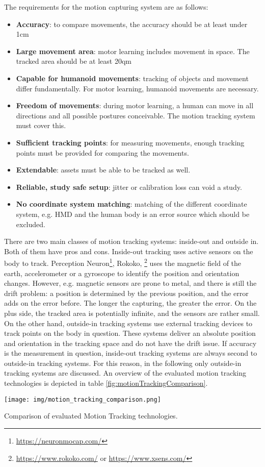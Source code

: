 The requirements for the motion capturing system are as follows: 
\begin{itemize}
	\item \textbf{Accuracy}: to compare movements, the accuracy should be at least under 1cm
	\item \textbf{Large movement area}: motor learning includes movement in space. The tracked area should be at least 20qm
	\item \textbf{Capable for humanoid movements}: tracking of objects and movement differ fundamentally. For motor learning, humanoid movements are necessary.
	\item \textbf{Freedom of movements}: during motor learning, a human can move in all directions and all possible postures conceivable. The motion tracking system must cover this.
	\item \textbf{Sufficient tracking points}: for measuring movements, enough tracking points must be provided for comparing the movements.
	\item \textbf{Extendable}: assets must be able to be tracked as well.
	\item \textbf{Reliable, study safe setup}: jitter or calibration loss can void a study.
	\item \textbf{No coordinate system matching}: matching of the different coordinate system, e.g. HMD and the human body is an error source which should be excluded.
\end{itemize}
There are two main classes of motion tracking systems: inside-out and outside in. Both of them have pros and cons. Inside-out tracking uses active sensors on the body to track. Perception Neuron\footnote{\href{https://neuronmocap.com/}{https://neuronmocap.com/}}, Rokoko, \footnote{\href{https://www.rokoko.com/}{https://www.rokoko.com/} or \href{https://www.xsens.com/}{https://www.xsens.com/}} uses the magnetic field of the earth, accelerometer or a gyroscope to identify the position and orientation changes. However, e.g. magnetic sensors are prone to metal, and there is still the drift problem: a position is determined by the previous position, and the error adds on the error before. The longer the capturing, the greater the error. On the plus side, the tracked area is potentially infinite, and the sensors are rather small. On the other hand, outside-in tracking systems use external tracking devices to track points on the body in question. These systems deliver an absolute position and orientation in the tracking space and do not have the drift issue. If accuracy is the measurement in question, inside-out tracking systems are always second to outside-in tracking systems. For this reason, in the following only outside-in tracking systems are discussed. An overview of the evaluated motion tracking technologies is depicted in table \ref{fig:motionTrackingComparison}.
\begin{table}
	\centering
	\texttt{[image: img/motion\_tracking\_comparison.png]}
	\caption{Comparison of evaluated Motion Tracking technologies.}
	\label{fig:motionTrackingComparison}
\end{table}

